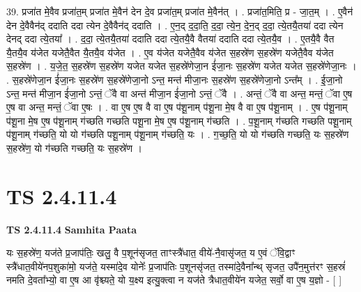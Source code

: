 \documentclass[17pt]{extarticle}
\begin{document}
39. प्रजा॑त मे॒वैव प्रजा॑त॒म् प्रजा॑त मे॒वैन॑ देन दे॒व प्रजा॑त॒म् प्रजा॑त मे॒वैन॑त् । . प्रजा॑त॒मिति॒ प्र - जा॒त॒म् । . ए॒वैन॑ देन दे॒वैवैन॑द् ददाति ददा त्येन दे॒वैवैन॑द् ददाति । . ए॒न॒द् द॒दा॒ति॒ द॒दा॒ त्ये॒न॒ दे॒न॒द् द॒दा॒ त्ये॒तयै॒तया॑ ददा त्येन देनद् ददा त्ये॒तया᳚ । . द॒दा॒ त्ये॒तयै॒तया॑ ददाति ददा त्ये॒तयै॒वै वैतया॑ ददाति ददा त्ये॒तयै॒व । . ए॒तयै॒वै वैत यै॒तयै॒व य॑जेत यजेतै॒वैत यै॒तयै॒व य॑जेत । . ए॒व य॑जेत यजेतै॒वैव य॑जेत स॒हस्रे॑ण स॒हस्रे॑ण यजेतै॒वैव य॑जेत स॒हस्रे॑ण । . य॒जे॒त॒ स॒हस्रे॑ण स॒हस्रे॑ण यजेत यजेत स॒हस्रे॑णेजा॒न ई॑जा॒नः स॒हस्रे॑ण यजेत यजेत स॒हस्रे॑णेजा॒नः । . स॒हस्रे॑णेजा॒न ई॑जा॒नः स॒हस्रे॑ण स॒हस्रे॑णेजा॒नो ऽन्त॒ मन्त॑ मीजा॒नः स॒हस्रे॑ण स॒हस्रे॑णेजा॒नो ऽन्त᳚म् । . ई॒जा॒नो ऽन्त॒ मन्त॑ मीजा॒न ई॑जा॒नो ऽन्तं॒ ॅवै वा अन्त॑ मीजा॒न ई॑जा॒नो ऽन्तं॒ ॅवै । . अन्तं॒ ॅवै वा अन्त॒ मन्तं॒ ॅवा ए॒ष ए॒ष वा अन्त॒ मन्तं॒ ॅवा ए॒षः । . वा ए॒ष ए॒ष वै वा ए॒ष प॑शू॒नाम् प॑शू॒ना मे॒ष वै वा ए॒ष प॑शू॒नाम् । . ए॒ष प॑शू॒नाम् प॑शू॒ना मे॒ष ए॒ष प॑शू॒नाम् ग॑च्छति गच्छति पशू॒ना मे॒ष ए॒ष प॑शू॒नाम् ग॑च्छति । . प॒शू॒नाम् ग॑च्छति गच्छति पशू॒नाम् प॑शू॒नाम् ग॑च्छति॒ यो यो ग॑च्छति पशू॒नाम् प॑शू॒नाम् ग॑च्छति॒ यः । . ग॒च्छ॒ति॒ यो यो ग॑च्छति गच्छति॒ यः स॒हस्रे॑ण स॒हस्रे॑ण॒ यो ग॑च्छति गच्छति॒ यः स॒हस्रे॑ण । \newline
\pagebreak
{}

\section{ TS 2.4.11.4 }

\textbf{TS 2.4.11.4 } \newline
\textbf{Samhita Paata} \newline

यः स॒हस्रे॑ण॒ यज॑ते प्र॒जाप॑तिः॒ खलु॒ वै प॒शून॑सृजत॒ ताꣳस्त्रै॑धात॒ वीये॑-नै॒वासृ॑जत॒ य ए॒वं ॅवि॒द्वाꣳ स्त्रै॑धात॒वीये॑नप॒शुका॑मो॒ यज॑ते॒ यस्मा॑दे॒व योनेः᳚ प्र॒जाप॑तिः प॒शूनसृ॑जत॒ तस्मा॑दे॒वैना᳚न्थ् सृजत॒ उपै॑न॒मुत्त॑रꣳ स॒हस्रं॑ नमति दे॒वता᳚भ्यो॒ वा ए॒ष आ वृ॑श्च्यते॒ यो य॒क्ष्य इत्यु॒क्त्वा न यज॑ते त्रैधात॒वीये॑न यजेत॒ सर्वो॒ वा ए॒ष य॒ज्ञो - [  ] \newline
\end{document}
